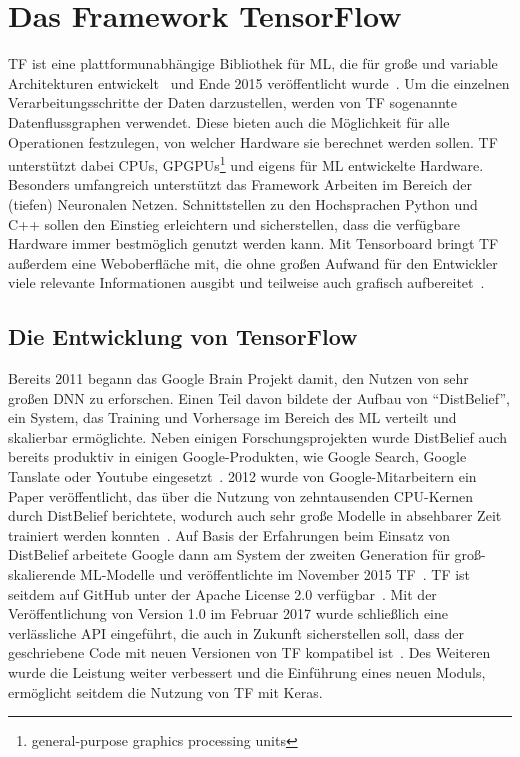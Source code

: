 \chapter{Das Framework TensorFlow}

\gls{TF} ist eine plattformunabhängige Bibliothek für \gls{ML}, die für große und variable Architekturen entwickelt~\cite{tensorflow2015-whitepaper} und Ende 2015 veröffentlicht wurde~\cite{tf-opensource}. Um die einzelnen Verarbeitungsschritte der Daten darzustellen, werden von \gls{TF} sogenannte Datenflussgraphen verwendet. Diese bieten auch die Möglichkeit für alle Operationen festzulegen, von welcher Hardware sie berechnet werden sollen. \gls{TF} unterstützt dabei CPUs, GPGPUs\footnote{general-purpose graphics processing units} und eigens für \gls{ML} entwickelte Hardware.
Besonders umfangreich unterstützt das Framework Arbeiten im Bereich der (tiefen) Neuronalen Netzen. Schnittstellen zu den Hochsprachen Python und C++ sollen den Einstieg erleichtern und sicherstellen, dass die verfügbare Hardware immer bestmöglich genutzt werden kann. Mit Tensorboard bringt \gls{TF} außerdem eine Weboberfläche mit, die ohne großen Aufwand für den Entwickler viele relevante Informationen ausgibt und teilweise auch grafisch aufbereitet~\cite{tensorflow2016-whitepaper}.

\section{Die Entwicklung von TensorFlow}
Bereits 2011 begann das Google Brain Projekt damit, den Nutzen von sehr großen \gls{DNN} zu erforschen. Einen Teil davon bildete der Aufbau von "`DistBelief"', ein System, das Training und Vorhersage im Bereich des \gls{ML} verteilt und skalierbar ermöglichte. Neben einigen Forschungsprojekten wurde DistBelief auch bereits produktiv in einigen Google-Produkten, wie Google Search, Google Tanslate oder Youtube eingesetzt~\cite{tensorflow2016-whitepaper}. 2012 wurde von Google-Mitarbeitern ein Paper veröffentlicht, das über die Nutzung von zehntausenden CPU-Kernen  durch DistBelief berichtete, wodurch auch sehr große Modelle in absehbarer Zeit trainiert werden konnten~\cite{NIPS2012}. Auf Basis der Erfahrungen beim Einsatz von DistBelief arbeitete Google dann am System der zweiten Generation für groß-skalierende \gls{ML}-Modelle und veröffentlichte im November 2015 \gls{TF}~\cite{tf-opensource}. \gls{TF} ist seitdem auf GitHub unter der Apache License 2.0 verfügbar~\cite{tf-git}.  Mit der Veröffentlichung von Version 1.0 im Februar 2017 wurde schließlich eine verlässliche API eingeführt, die auch in Zukunft sicherstellen soll, dass der geschriebene Code mit neuen Versionen von \gls{TF} kompatibel ist~\cite{tf1}. Des Weiteren wurde die Leistung weiter verbessert und die Einführung eines neuen Moduls, ermöglicht seitdem die Nutzung von \gls{TF} mit Keras.

